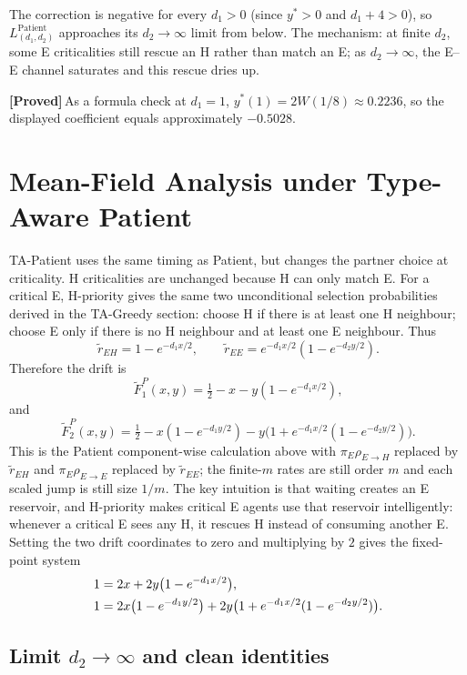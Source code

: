\documentclass{article}
\theoremstyle{plain}
\theoremstyle{definition}
\newcommand{\proved}{\textcolor{provedgreen}{\textbf{[Proved]}}\,}
\begin{document}
The correction is negative for every $d_1>0$ (since $y^\ast>0$ and $d_1+4>0$), so $L^{\text{Patient}}_{(d_1,d_2)}$ approaches its $d_2\to\infty$ limit from below. The mechanism: at finite $d_2$, some E criticalities still rescue an H rather than match an E; as $d_2\to\infty$, the E--E channel saturates and this rescue dries up.

\proved As a formula check at $d_1=1$, $y^\ast(1)=2W(1/8)\approx 0.2236$, so the displayed coefficient equals approximately $-0.5028$.


\section{Mean-Field Analysis under Type-Aware Patient}
\label{sec:TAP}

TA-Patient uses the same timing as Patient, but changes the partner choice at criticality. H criticalities are unchanged because H can only match E. For a critical E, H-priority gives the same two unconditional selection probabilities derived in the TA-Greedy section: choose H if there is at least one H neighbour; choose E only if there is no H neighbour and at least one E neighbour. Thus
\[
\widetilde r_{EH}=1-e^{-d_1x/2},\qquad
\widetilde r_{EE}=e^{-d_1x/2}(1-e^{-d_2y/2}).
\]
Therefore the drift is
\[
\widetilde F_1^P(x,y)=\tfrac12-x-y(1-e^{-d_1x/2}),
\]
and
\[
\widetilde F_2^P(x,y)=\tfrac12-x(1-e^{-d_1y/2})-y\bigl(1+e^{-d_1x/2}(1-e^{-d_2y/2})\bigr).
\]
This is the Patient component-wise calculation above with $\pi_E\rho_{E\to H}$ replaced by $\widetilde r_{EH}$ and $\pi_E\rho_{E\to E}$ replaced by $\widetilde r_{EE}$; the finite-$m$ rates are still order $m$ and each scaled jump is still size $1/m$.
The key intuition is that waiting creates an E reservoir, and H-priority makes critical E agents use that reservoir intelligently: whenever a critical E sees any H, it rescues H instead of consuming another E. Setting the two drift coordinates to zero and multiplying by $2$ gives the fixed-point system
\begin{align}
1 &= 2x+2y\bigl(1-e^{-d_1 x/2}\bigr),\notag\\
1 &= 2x\bigl(1-e^{-d_1 y/2}\bigr)+2y\bigl(1+e^{-d_1 x/2}(1-e^{-d_2 y/2})\bigr).\label{eq:TAP-system}
\end{align}

\subsection{Limit $d_2\to\infty$ and clean identities}
\end{document}
